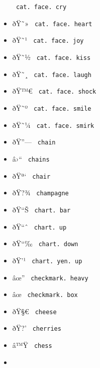 \begin{itemize}
{  \texttt{\ cat.\ face.\ cry\ }}
\item
  \label{symbol-cat.face.heart}{{ ðŸ˜» }
  \texttt{\ cat.\ face.\ heart\ }}
\item
  \label{symbol-cat.face.joy}{{ ðŸ˜¹ }
  \texttt{\ cat.\ face.\ joy\ }}
\item
  \label{symbol-cat.face.kiss}{{ ðŸ˜½ }
  \texttt{\ cat.\ face.\ kiss\ }}
\item
  \label{symbol-cat.face.laugh}{{ ðŸ˜¸ }
  \texttt{\ cat.\ face.\ laugh\ }}
\item
  \label{symbol-cat.face.shock}{{ ðŸ™€ }
  \texttt{\ cat.\ face.\ shock\ }}
\item
  \label{symbol-cat.face.smile}{{ ðŸ˜º }
  \texttt{\ cat.\ face.\ smile\ }}
\item
  \label{symbol-cat.face.smirk}{{ ðŸ˜¼ }
  \texttt{\ cat.\ face.\ smirk\ }}
\item
  \label{symbol-chain}{{ ðŸ''--- } \texttt{\ chain\ }}
\item
  \label{symbol-chains}{{ â›`` } \texttt{\ chains\ }}
\item
  \label{symbol-chair}{{ ðŸª` } \texttt{\ chair\ }}
\item
  \label{symbol-champagne}{{ ðŸ?¾ }
  \texttt{\ champagne\ }}
\item
  \label{symbol-chart.bar}{{ ðŸ``Š }
  \texttt{\ chart.\ bar\ }}
\item
  \label{symbol-chart.up}{{ ðŸ``ˆ }
  \texttt{\ chart.\ up\ }}
\item
  \label{symbol-chart.down}{{ ðŸ``‰ }
  \texttt{\ chart.\ down\ }}
\item
  \label{symbol-chart.yen.up}{{ ðŸ'¹ }
  \texttt{\ chart.\ yen.\ up\ }}
\item
  \label{symbol-checkmark.heavy}{{ âœ'' }
  \texttt{\ checkmark.\ heavy\ }}
\item
  \label{symbol-checkmark.box}{{ âœ }
  \texttt{\ checkmark.\ box\ }}
\item
  \label{symbol-cheese}{{ ðŸ§€ } \texttt{\ cheese\ }}
\item
  \label{symbol-cherries}{{ ðŸ?' } \texttt{\ cherries\ }}
\item
  \label{symbol-chess}{{ â™Ÿ } \texttt{\ chess\ }}
\item

\end{itemize}
